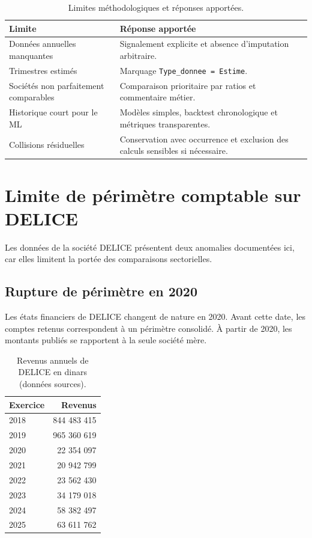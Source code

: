 \begin{table}[H]
\centering
\caption{Limites méthodologiques et réponses apportées.}
\label{tab:ann_limites}
\begin{tabularx}{\linewidth}{|p{4cm}|X|}
\hline
\textbf{Limite} & \textbf{Réponse apportée} \\ \hline
Données annuelles manquantes & Signalement explicite et absence d'imputation arbitraire. \\ \hline
Trimestres estimés & Marquage \texttt{Type\_donnee = Estime}. \\ \hline
Sociétés non parfaitement comparables & Comparaison prioritaire par ratios et commentaire métier. \\ \hline
Historique court pour le ML & Modèles simples, backtest chronologique et métriques transparentes. \\ \hline
Collisions résiduelles & Conservation avec occurrence et exclusion des calculs sensibles si nécessaire. \\ \hline
\end{tabularx}
\end{table}

\section{Limite de périmètre comptable sur DELICE}
\label{ann:delice}
Les données de la société DELICE présentent deux anomalies documentées ici,
car elles limitent la portée des comparaisons sectorielles.

\subsection{Rupture de périmètre en 2020}
Les états financiers de DELICE changent de nature en 2020. Avant cette date,
les comptes retenus correspondent à un périmètre consolidé. À partir de 2020,
les montants publiés se rapportent à la seule société mère.

\begin{table}[H]
\centering
\caption{Revenus annuels de DELICE en dinars (données sources).}
\label{tab:ann_delice_revenus}
\begin{tabular}{|l|r|}
\hline
\textbf{Exercice} & \textbf{Revenus} \\ \hline
2018 & 844 483 415 \\ \hline
2019 & 965 360 619 \\ \hline
2020 & 22 354 097 \\ \hline
2021 & 20 942 799 \\ \hline
2022 & 23 562 430 \\ \hline
2023 & 34 179 018 \\ \hline
2024 & 58 382 497 \\ \hline
2025 & 63 611 762 \\ \hline
\end{tabular}
\end{table}

